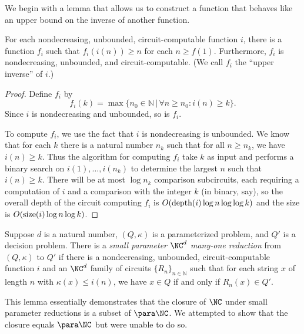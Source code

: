 We begin with a lemma that allows us to construct a function that behaves like an upper bound on the inverse of another function.

\begin{lemma}\label{lem:upperinverse}
  For each nondecreasing, unbounded, circuit-computable function $i$, there is a function $f_i$ such that $f_i(i(n)) \geq n$ for each $n \geq f(1)$.
  Furthermore, $f_i$ is nondecreasing, unbounded, and circuit-computable.
  (We call $f_i$ the ``upper inverse'' of $i$.)
\end{lemma}
\begin{proof}
  Define $f_i$ by
  \[
  f_i(k) = \max\{ n_0 \in \mathbb{N} \, | \, \forall n \geq n_0 \colon i(n) \geq k \}.
  \]
  Since $i$ is nondecreasing and unbounded, so is $f_i$.

  To compute $f_i$, we use the fact that $i$ is nondecreasing is unbounded.
  We know that for each $k$ there is a natural number $n_k$ such that for all $n \geq n_k$, we have $i(n) \geq k$.
  Thus the algorithm for computing $f_i$ take $k$ as input and performs a binary search on $i(1), \dotsc, i(n_k)$ to determine the largest $n$ such that $i(n) \geq k$.
  There will be at most $\log n_k$ comparison subcircuits, each requiring a computation of $i$ and a comparison with the integer $k$ (in binary, say), so the overall depth of the circuit computing $f_i$ is $O(\operatorname{depth}(i) \log n \log \log k)$ and the size is $O(\operatorname{size}(i) \log n \log k)$.
\end{proof}

\begin{definition}\label{def:spreduction}
  Suppose $d$ is a natural number, $(Q, \kappa)$ is a parameterized problem, and $Q'$ is a decision problem.
  There is a \emph{small parameter $\NC^d$ many-one reduction} from $(Q, \kappa)$ to $Q'$ if there is a nondecreasing, unbounded, circuit-computable function $i$ and an $\NC^d$ family of circuits $\{R_n\}_{n \in \mathbb{N}}$ such that for each string $x$ of length $n$ with $\kappa(x) \leq i(n)$, we have $x \in Q$ if and only if $R_n(x) \in Q'$.
\end{definition}

This lemma essentially demonstrates that the closure of $\NC$ under small parameter reductions is a subset of $\para \NC$.
We attempted to show that the closure equals $\para \NC$ but were unable to do so.

